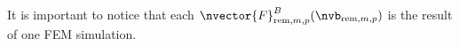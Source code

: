 \documentclass[article,brazil,english]{techreport}
\newcommand{\indexremmk}[2]{\mathrm{rem},{#1},{#2}}
\newcommand{\nvbremmk}[2]{\nvb_{\indexremmk{#1}{#2}}}
\newcommand{\nvfremmk}[2]{\nvector{F}^B_{\indexremmk{#1}{#2}}}
\begin{document}
It is important to notice that each $\nvfremmk{m}{p}(\nvbremmk{m}{p})$ is the result of one FEM simulation.

\postextual


\end{document}
